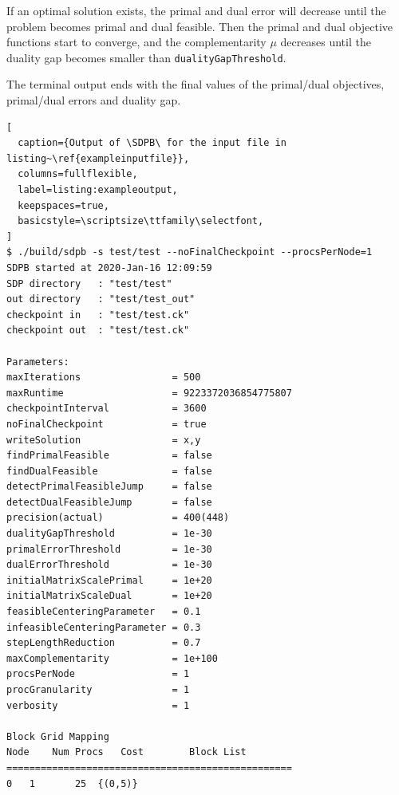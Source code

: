 \documentclass[12pt]{article}
\numberwithin{equation}{section}
\newcommand\SDPB{\texttt{SDPB}}
\begin{document}
If an optimal solution exists, the primal and dual error will decrease until the problem becomes primal and dual feasible.  Then the primal and dual objective functions start to converge, and the complementarity $\mu$ decreases until the duality gap becomes smaller than \texttt{dualityGapThreshold}.

The terminal output ends with the final values of the primal/dual objectives, primal/dual errors and duality gap.

\begin{lstlisting}[
  caption={Output of \SDPB\ for the input file in listing~\ref{exampleinputfile}},
  columns=fullflexible,
  label=listing:exampleoutput,
  keepspaces=true,
  basicstyle=\scriptsize\ttfamily\selectfont,
]
$ ./build/sdpb -s test/test --noFinalCheckpoint --procsPerNode=1
SDPB started at 2020-Jan-16 12:09:59
SDP directory   : "test/test"
out directory   : "test/test_out"
checkpoint in   : "test/test.ck"
checkpoint out  : "test/test.ck"

Parameters:
maxIterations                = 500
maxRuntime                   = 9223372036854775807
checkpointInterval           = 3600
noFinalCheckpoint            = true
writeSolution                = x,y
findPrimalFeasible           = false
findDualFeasible             = false
detectPrimalFeasibleJump     = false
detectDualFeasibleJump       = false
precision(actual)            = 400(448)
dualityGapThreshold          = 1e-30
primalErrorThreshold         = 1e-30
dualErrorThreshold           = 1e-30
initialMatrixScalePrimal     = 1e+20
initialMatrixScaleDual       = 1e+20
feasibleCenteringParameter   = 0.1
infeasibleCenteringParameter = 0.3
stepLengthReduction          = 0.7
maxComplementarity           = 1e+100
procsPerNode                 = 1
procGranularity              = 1
verbosity                    = 1

Block Grid Mapping
Node	Num Procs	Cost		Block List
==================================================
0	1		25	{(0,5)}




\end{lstlisting}
\end{document}
